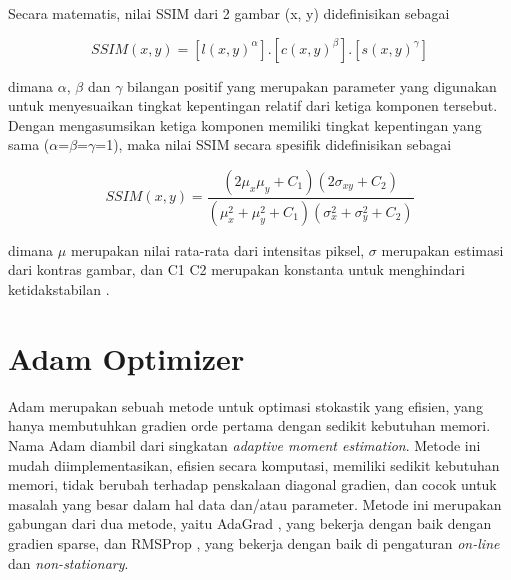 Secara matematis, nilai SSIM dari 2 gambar (x, y) didefinisikan sebagai 

\begin{equation}
  \label{eq:ssim1}
  SSIM(x,y) =  [l(x,y)^{ \alpha } ] . [c(x,y)^{ \beta }].[s(x,y)^{ \gamma }]
\end{equation}

dimana $\alpha$, $\beta$ dan $\gamma$ bilangan positif yang merupakan parameter yang digunakan untuk menyesuaikan tingkat kepentingan relatif dari ketiga komponen tersebut. 
Dengan mengasumsikan ketiga komponen memiliki tingkat kepentingan yang sama ($\alpha$=$\beta$=$\gamma$=1), maka nilai SSIM secara spesifik didefinisikan sebagai 

\begin{equation}
  \label{eq:ssim2}
  SSIM(x,y) =  \frac{(2  \mu_{x} \mu_{y} + C_{1})(2 \sigma_{xy} + C_{2} )}{(\mu_{x}^{2}  + \mu_{y}^{2}+C_{1})(\sigma_{x}^{2}+\sigma_{y}^{2}+C_{2})} 
\end{equation}

dimana $\mu$ merupakan nilai rata-rata dari intensitas piksel, $\sigma$ merupakan estimasi dari kontras gambar, dan C1 C2 merupakan konstanta untuk menghindari ketidakstabilan \parencite{SSIM}.

\section{Adam Optimizer}
\label{adamOptimizer}

Adam merupakan sebuah metode untuk optimasi stokastik yang efisien, yang hanya membutuhkan gradien orde pertama dengan sedikit kebutuhan memori. 
Nama Adam diambil dari singkatan \emph{adaptive moment estimation}. 
Metode ini mudah diimplementasikan, efisien secara komputasi, memiliki sedikit kebutuhan memori, tidak berubah terhadap penskalaan diagonal gradien, dan cocok untuk masalah yang besar dalam hal data dan/atau parameter. 
Metode ini merupakan gabungan dari dua metode, yaitu AdaGrad \parencite{adaGrad}, yang bekerja dengan baik dengan gradien sparse, 
dan RMSProp \parencite{RMSProp}, yang bekerja dengan baik di pengaturan \emph{on-line} dan \emph{non-stationary}\parencite{adam}.